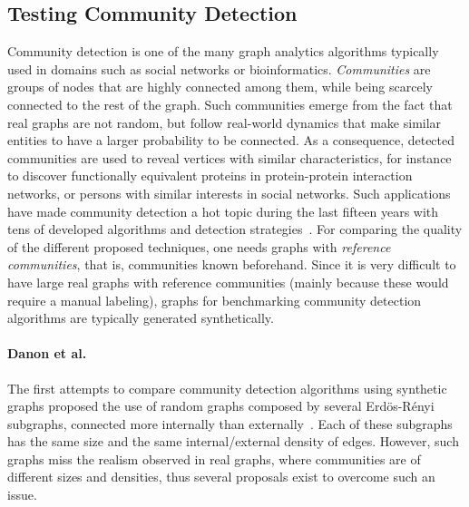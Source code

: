 \subsection{Testing Community Detection}
\label{sec:generators_community_detection}

Community detection is one of the many graph analytics algorithms typically used
in domains such as social networks or bioinformatics. \emph{Communities} are groups of nodes that are highly connected among them, while being scarcely connected to
the rest of the graph. Such communities emerge from the fact that real graphs
are not random, but follow real-world dynamics that make similar entities to
have a larger probability to be connected. As a consequence, detected
communities are used to reveal vertices with similar characteristics, for
instance to discover functionally equivalent proteins in protein-protein
interaction networks, or persons with similar interests in social networks. Such
applications have made community detection a hot topic during the last fifteen
years with tens of developed algorithms and detection
strategies~\cite{doi:10.1002/wics.1403,Kim:2015:CDM:2854006.2854013}. For
comparing the quality of the different proposed techniques, one needs graphs
with \emph{reference communities}, that is, communities known beforehand. Since
it is very difficult to have large real graphs with reference communities
(mainly because these would require a manual labeling), graphs for benchmarking
community detection algorithms are typically generated synthetically.

\paragraph{Danon et al.} The first attempts to compare community detection algorithms using synthetic
graphs proposed the use of random graphs composed by several Erd\"{o}s-R\'{e}nyi
subgraphs, connected more internally than externally~\cite{danon2005comparing}.
Each of these subgraphs has the same size and the same internal/external density
of edges. However, such graphs miss the realism observed in real graphs, where
communities are of different sizes and densities, thus several proposals exist
to overcome such an issue.

